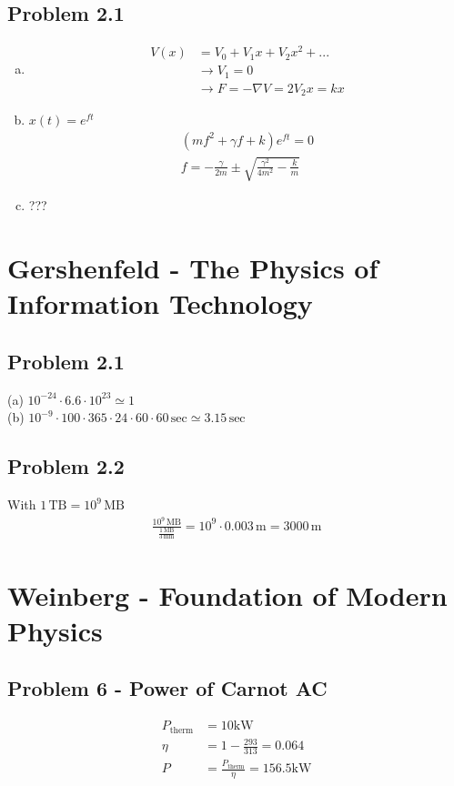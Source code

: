 \documentclass[../main.tex]{subfiles}
\begin{document}
\subsection{Problem 2.1}
\begin{enumerate}[(a)]
\item 
\begin{align}
V(x)&=V_0+V_1x+V_2x^2+...\\
&\rightarrow V_1=0\\
&\rightarrow F=-\nabla V=2V_2x=kx
\end{align}
\item $x(t)=e^{ft}$
\begin{align}
(mf^2+\gamma f+k)e^{ft}=0\\
f=-\frac{\gamma}{2m}\pm\sqrt{\frac{\gamma^2}{4m^2}-\frac{k}{m}}
\end{align}
\item ???
\end{enumerate}



\section{{\sc Gershenfeld} - The Physics of Information Technology}
\subsection{Problem 2.1}
(a) $10^{-24}\cdot6.6\cdot10^{23}\simeq1$\\
(b) $10^{-9}\cdot100\cdot365\cdot24\cdot60\cdot60\,\text{sec}\simeq3.15\,\text{sec}$
\subsection{Problem 2.2}
With $1\,\text{TB}=10^9\,\text{MB}$
\begin{align}
\frac{10^{9}\,\text{MB}}{\frac{1\,\text{MB}}{3\,\text{mm}}}
=10^{9}\cdot0.003\,\text{m}=3000\,\text{m}
\end{align}



\section{{\sc Weinberg} - Foundation of Modern Physics}

\subsection{Problem 6 - Power of Carnot AC}
\begin{align}
P_\text{therm}&=10\text{kW}\\
\eta&=1-\frac{293}{313}=0.064\\
P&=\frac{P_\text{therm}}{\eta}=156.5\text{kW}
\end{align}
\end{document}
